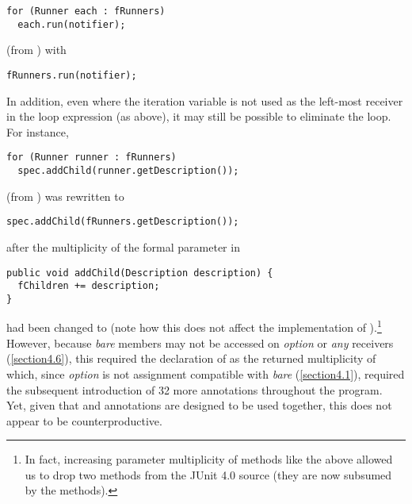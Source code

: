 {\begin{lstlisting}
for (Runner each : fRunners)
  each.run(notifier);
\end{lstlisting}

\noindent (from ) with

\begin{lstlisting}
fRunners.run(notifier);
\end{lstlisting}

\noindent In addition, even where the iteration variable is not used as the
left-most receiver in the loop expression (as above), it may still be
possible to eliminate the loop. For instance,

\begin{lstlisting}
for (Runner runner : fRunners)
  spec.addChild(runner.getDescription());
\end{lstlisting}

\noindent (from ) was rewritten to

\begin{lstlisting}
spec.addChild(fRunners.getDescription());
\end{lstlisting}

\noindent after the multiplicity of the formal parameter 
in

\begin{lstlisting}
public void addChild(Description description) {
  fChildren += description;
}
\end{lstlisting}

\noindent had been changed to  (note how this does not affect the
implementation of ).\footnote{In fact, increasing parameter multiplicity of  methods like the above allowed us to drop two  methods from the JUnit 4.0 source (they are now subsumed by the  methods).} However, because \emph{bare}
members may not be accessed on \emph{option} or \emph{any}
receivers (\autoref{section4.6}), this required the declaration of  as
the returned multiplicity of  which, since
\emph{option} is not assignment compatible with \emph{bare}
(\autoref{section4.1}), required the subsequent introduction of 32 more
 annotations throughout the program. Yet, given that
 and  annotations are designed to be used together,
this does not appear to be counterproductive.

}
